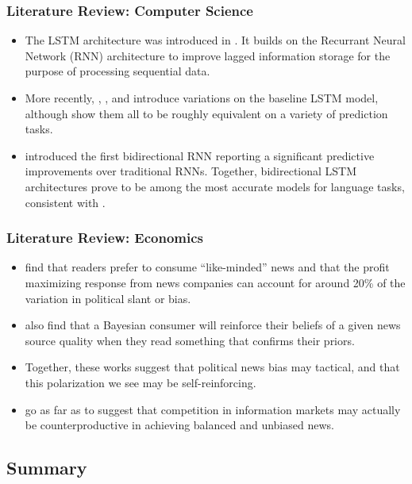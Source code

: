 \documentclass{beamer}
\begin{document}
	\begin{frame}
		\frametitle{Literature Review: Computer Science}
		\begin{itemize}
			\item The LSTM architecture was introduced in \citet{hochreiter1997long}. It builds on the Recurrant Neural Network (RNN) architecture to improve lagged information storage for the purpose of processing sequential data.
			\item More recently, \citet{gers2000recurrent}, \citet{chung2014empirical}, and \citet{yao2015depth} introduce variations on the baseline \citet{hochreiter1997long} LSTM model, although \citet{greff2016lstm} show them all to be roughly equivalent on a variety of prediction tasks. 
			\item \citet{schuster1997bidirectional} introduced the first bidirectional RNN reporting a significant predictive improvements over traditional RNNs. Together, bidirectional LSTM architectures prove to be among the most accurate models for language tasks, consistent with \citet{wang2015unified}. 
		\end{itemize}
	\end{frame}
	
	\begin{frame}
		\frametitle{Literature Review: Economics}
		\begin{itemize}
			\item \citet{gentzkow2010drives} find that readers prefer to consume ``like-minded'' news and that the profit maximizing response from news companies can account for around 20\% of the variation in political slant or bias.
			\item \citet{gentzkow2006media} also find that a Bayesian consumer will reinforce their beliefs of a given news source quality when they read something that confirms their priors.
			\item Together, these works suggest that political news bias may tactical, and that this polarization we see may be self-reinforcing.
			\item \citet{gentzkow2008competition} go as far as to suggest that competition in information markets may actually be counterproductive in achieving balanced and unbiased news. 
		\end{itemize}
	\end{frame}

    \subsection{Summary}
    
\end{document}
